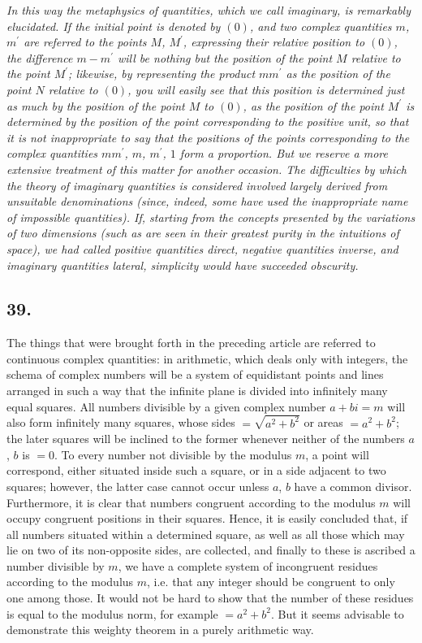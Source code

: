 \documentclass[twoside,12pt, showframe]{memoir}
\begin{document}
\emph{In this way the metaphysics of quantities, which we call imaginary, is remarkably elucidated. If the initial point is denoted by \((0)\), and two complex quantities \(m\), \(m^{\prime}\) are referred to the points \(M\), \(M^{\prime}\), expressing their relative position to \((0)\), the difference \(m-m^{\prime}\) will be nothing but the position of the point \(M\) relative to the point \(M^{\prime}\); likewise, by representing the product \(m m^{\prime}\) as the position of the point \(N\) relative to \((0)\), you will easily see that this position is determined just as much by the position of the point \(M\) to \((0)\), as the position of the point \(M^{\prime}\) is determined by the position of the point corresponding to the positive unit, so that it is not inappropriate to say that the positions of the points corresponding to the complex quantities \(m m^{\prime}\), \(m\), \(m^{\prime}\), \(1\) form a \textit{proportion}. But we reserve a more extensive treatment of this matter for another occasion. The difficulties by which the theory of imaginary quantities is considered involved largely derived from unsuitable denominations (since, indeed, some have used the inappropriate name of impossible quantities). If, starting from the concepts presented by the variations of two dimensions (such as are seen in their greatest purity in the intuitions of space), we had called positive quantities direct, negative quantities inverse, and imaginary quantities lateral, simplicity would have succeeded obscurity.}
%

\subsection*{39.}

The things that were brought forth in the preceding article are referred to continuous complex quantities: in arithmetic, which deals only with integers, the schema of complex numbers will be a system of equidistant points and lines arranged in such a way that the infinite plane is divided into infinitely many equal squares. All numbers divisible by a given complex number \(a+bi=m\) will also form infinitely many squares, whose sides \(=\sqrt{a^2+b^2}\) or areas \(=a^2+b^2\); the later squares will be inclined to the former whenever neither of the numbers \(a\), \(b\) is \(=0\). To every number not divisible by the modulus \(m\), a point will correspond, either situated inside such a square, or in a side adjacent to two squares; however, the latter case cannot occur unless \(a\), \(b\) have a common divisor. Furthermore, it is clear that numbers congruent according to the modulus \(m\) will occupy congruent positions in their squares. Hence, it is easily concluded that, if all numbers situated within a determined square, as well as all those which may lie on two of its non-opposite sides, are collected, and finally to these is ascribed a number divisible by \(m\), we have a complete system of incongruent residues according to the modulus \(m\), i.e. that any integer should be congruent to only one among those. It would not be hard to show that the number of these residues is equal to the modulus norm, for example \(=a^2+b^2\). But it seems advisable to demonstrate this weighty theorem in a purely arithmetic way.
\end{document}
